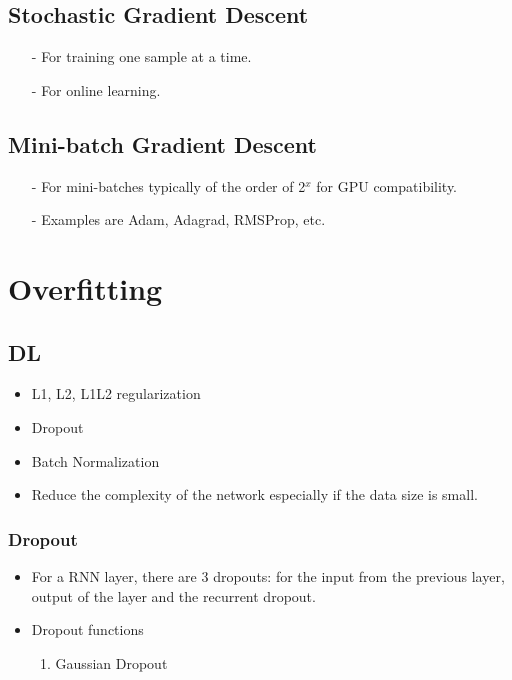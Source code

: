 \documentclass[a4paper, 12pt]{report}
\begin{document}
\section{Stochastic Gradient Descent}
\begin{itemize}
\item[-] For training one sample at a time.

\item[-] For online learning.
\end{itemize}

\section{Mini-batch Gradient Descent}
\begin{itemize}
\item[-] For mini-batches typically of the order of 2$^x$ for GPU compatibility.
\item[-] Examples are Adam, Adagrad, RMSProp, etc.
\end{itemize}


\chapter{Overfitting}

\section{DL}
\begin{itemize}
\item L1, L2, L1L2 regularization
\item Dropout
\item Batch Normalization
\item Reduce the complexity of the network especially if the data size is small.
\end{itemize}

\subsection{Dropout}
\begin{itemize}

\item For a RNN layer, there are 3 dropouts: for the input from the previous layer, output of the layer and the recurrent dropout.
\item Dropout functions
\begin{enumerate}
\item Gaussian Dropout
\end{enumerate}
\end{itemize}
\end{document}
